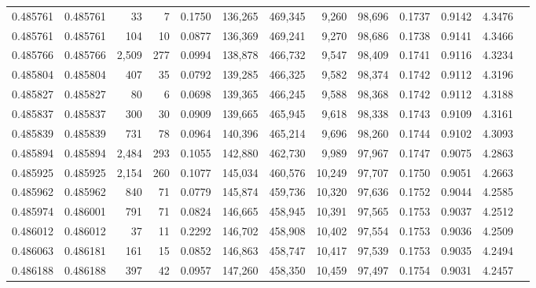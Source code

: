 \begin{tabular}{rrrrrrrrrrrrr}
0.485761 & 0.485761 &    33 &     7 &                                     0.1750 & 136,265 & 469,345 &   9,260 &  98,696 & 0.1737 & 0.9142 & 4.3476 \\
0.485761 & 0.485761 &   104 &    10 &                                     0.0877 & 136,369 & 469,241 &   9,270 &  98,686 & 0.1738 & 0.9141 & 4.3466 \\
0.485766 & 0.485766 & 2,509 &   277 &                                     0.0994 & 138,878 & 466,732 &   9,547 &  98,409 & 0.1741 & 0.9116 & 4.3234 \\
0.485804 & 0.485804 &   407 &    35 &                                     0.0792 & 139,285 & 466,325 &   9,582 &  98,374 & 0.1742 & 0.9112 & 4.3196 \\
0.485827 & 0.485827 &    80 &     6 &                                     0.0698 & 139,365 & 466,245 &   9,588 &  98,368 & 0.1742 & 0.9112 & 4.3188 \\
0.485837 & 0.485837 &   300 &    30 &                                     0.0909 & 139,665 & 465,945 &   9,618 &  98,338 & 0.1743 & 0.9109 & 4.3161 \\
0.485839 & 0.485839 &   731 &    78 &                                     0.0964 & 140,396 & 465,214 &   9,696 &  98,260 & 0.1744 & 0.9102 & 4.3093 \\
0.485894 & 0.485894 & 2,484 &   293 &                                     0.1055 & 142,880 & 462,730 &   9,989 &  97,967 & 0.1747 & 0.9075 & 4.2863 \\
0.485925 & 0.485925 & 2,154 &   260 &                                     0.1077 & 145,034 & 460,576 &  10,249 &  97,707 & 0.1750 & 0.9051 & 4.2663 \\
0.485962 & 0.485962 &   840 &    71 &                                     0.0779 & 145,874 & 459,736 &  10,320 &  97,636 & 0.1752 & 0.9044 & 4.2585 \\
0.485974 & 0.486001 &   791 &    71 &                                     0.0824 & 146,665 & 458,945 &  10,391 &  97,565 & 0.1753 & 0.9037 & 4.2512 \\
0.486012 & 0.486012 &    37 &    11 &                                     0.2292 & 146,702 & 458,908 &  10,402 &  97,554 & 0.1753 & 0.9036 & 4.2509 \\
0.486063 & 0.486181 &   161 &    15 &                                     0.0852 & 146,863 & 458,747 &  10,417 &  97,539 & 0.1753 & 0.9035 & 4.2494 \\
0.486188 & 0.486188 &   397 &    42 &                                     0.0957 & 147,260 & 458,350 &  10,459 &  97,497 & 0.1754 & 0.9031 & 4.2457 \\

\end{tabular}
